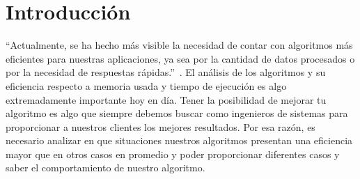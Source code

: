 
\section{Introducción} %
“Actualmente, se ha hecho más visible la necesidad de contar con algoritmos más eficientes para nuestras aplicaciones, ya sea por la cantidad de datos procesados o por la necesidad de respuestas rápidas.”~\cite{Rojas2022}.
El análisis de los algoritmos y su eficiencia respecto a memoria usada y tiempo de ejecución es algo extremadamente importante hoy en día. Tener la posibilidad de mejorar tu algoritmo es algo que siempre debemos buscar como ingenieros de sistemas para proporcionar a nuestros clientes los mejores resultados. Por esa razón, es necesario analizar en que situaciones nuestros algoritmos presentan una eficiencia mayor que en otros casos en promedio y poder proporcionar diferentes casos y saber el comportamiento de nuestro algoritmo. 
